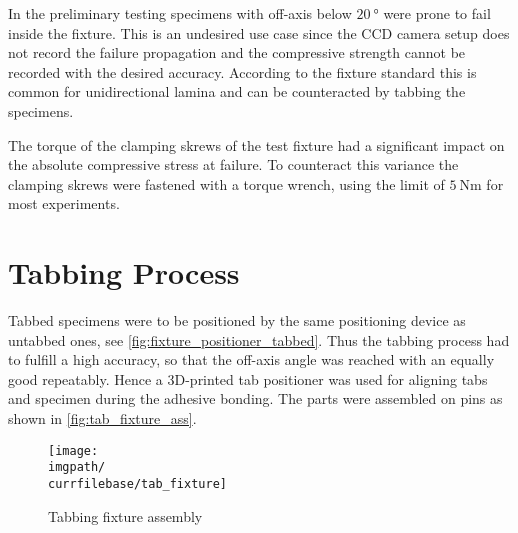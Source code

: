 In the preliminary testing specimens with off-axis below $\SI{20}{\degree}$ were prone to fail inside the fixture. This is an undesired use case since the CCD camera setup does not record the failure propagation and the compressive strength cannot be recorded with the desired accuracy. According to the fixture standard \cite{D6641standard} this is common for unidirectional lamina and can be counteracted by tabbing the specimens.

The torque of the clamping skrews of the test fixture had a significant impact on the absolute compressive stress at failure. To counteract this variance the clamping skrews were fastened with a torque wrench, using the limit of $\SI{5}{\newton\meter}$ for most experiments.

\section{Tabbing Process}
\label{sec:tabbing_process}

Tabbed specimens were to be positioned by the same positioning device as untabbed ones, see \autoref{fig:fixture_positioner_tabbed}. Thus the tabbing process had to fulfill a high accuracy, so that the off-axis angle was reached with an equally good repeatably. Hence a 3D-printed tab positioner was used for aligning tabs and specimen during the adhesive bonding. The parts were assembled on pins as shown in \autoref{fig:tab_fixture_ass}.

\begin{figure}[!ht]
    \centering
    \texttt{[image: \\imgpath/\\currfilebase/tab\_fixture]}
    \caption{Tabbing fixture assembly}
    \label{fig:tab_fixture_ass}
\end{figure}